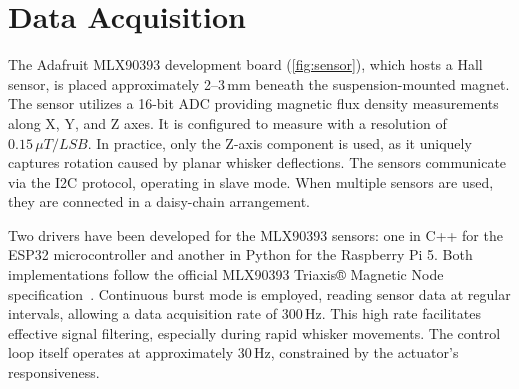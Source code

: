 \section{Data Acquisition}

The Adafruit MLX90393 development board (\cref{fig:sensor}), which hosts a Hall sensor, is placed approximately 2--3\,mm beneath the suspension-mounted magnet.
The sensor utilizes a 16-bit ADC providing magnetic flux density measurements along X, Y, and Z axes.
It is configured to measure with a resolution of \(0.15\,\mu T/LSB\).
In practice, only the Z-axis component is used, as it uniquely captures rotation caused by planar whisker deflections.
The sensors communicate via the I2C protocol, operating in slave mode.
When multiple sensors are used, they are connected in a daisy-chain arrangement.

Two drivers have been developed for the MLX90393 sensors: one in C++ for the ESP32 microcontroller and another in Python for the Raspberry Pi 5.
Both implementations follow the official MLX90393 Triaxis® Magnetic Node specification~\cite{MLX90393}.
Continuous burst mode is employed, reading sensor data at regular intervals, allowing a data acquisition rate of 300\,Hz.
This high rate facilitates effective signal filtering, especially during rapid whisker movements.
The control loop itself operates at approximately 30\,Hz, constrained by the actuator’s responsiveness.

